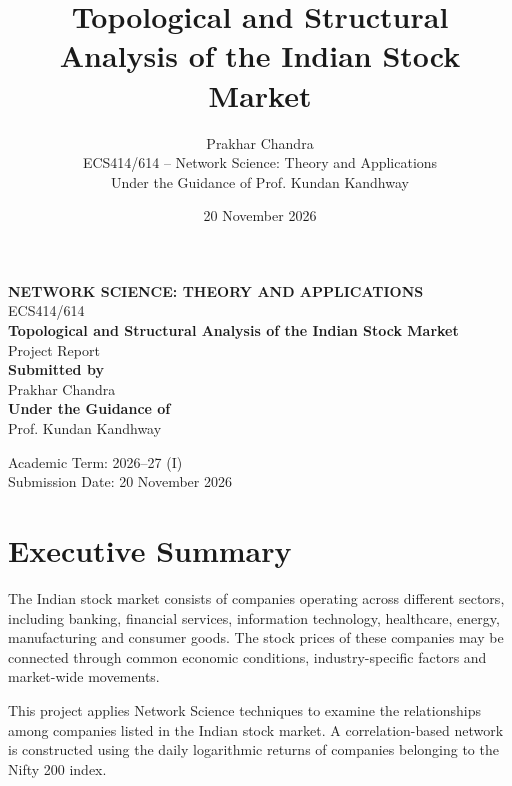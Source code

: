 \documentclass[11pt,a4paper]{article}
\title{
    \textbf{Topological and Structural Analysis of the Indian Stock Market}
}
\author{
    Prakhar Chandra\\
    ECS414/614 -- Network Science: Theory and Applications\\
    Under the Guidance of Prof. Kundan Kandhway
}
\date{20 November 2026}
\begin{document}
\begin{titlepage}
    \centering

    \vspace*{1.5cm}

    {\Large \textbf{NETWORK SCIENCE: THEORY AND APPLICATIONS}}\\[0.5cm]

    {\large ECS414/614}\\[2cm]

    {\huge \textbf{Topological and Structural Analysis of the Indian Stock Market}}\\[2cm]

    {\Large Project Report}\\[1.5cm]

    \textbf{Submitted by}\\[0.3cm]
    {\Large Prakhar Chandra}\\[1cm]

    \textbf{Under the Guidance of}\\[0.3cm]
    {\large Prof. Kundan Kandhway}\\[2cm]

    \vfill

    {\large Academic Term: 2026--27 (I)}\\[0.3cm]
    {\large Submission Date: 20 November 2026}

\end{titlepage}

\tableofcontents
\newpage

\section{Executive Summary}

The Indian stock market consists of companies operating across
different sectors, including banking, financial services,
information technology, healthcare, energy, manufacturing and
consumer goods. The stock prices of these companies may be
connected through common economic conditions, industry-specific
factors and market-wide movements.

This project applies Network Science techniques to examine the
relationships among companies listed in the Indian stock market.
A correlation-based network is constructed using the daily
logarithmic returns of companies belonging to the Nifty 200 index.
\end{document}
